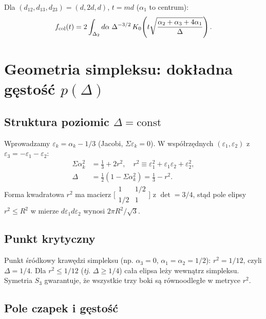 \documentclass[11pt,a4paper]{article}
\newcommand{\Dt}{\Delta}
\begin{document}
Dla $(d_{12},d_{13},d_{23})=(d,2d,d)$, $t=md$ ($\alpha_1$ to centrum):
\begin{equation}
\label{eq:f_col}
f_{\rm col}(t)
= 2\int_{\Delta_2} d\alpha\;\Dt^{-3/2}\,
K_0\!\left(t\sqrt{\frac{\alpha_2+\alpha_3+4\alpha_1}{\Dt}}\right).
\end{equation}

\section{Geometria simpleksu: dok\l{}adna g\k{e}sto\'s\'c $p(\Delta)$}
\label{sec:density}

\subsection{Struktura poziomic $\Delta=\text{const}$}

Wprowadzamy $\varepsilon_k=\alpha_k-1/3$ (Jacobi, $\Sigma\varepsilon_k=0$).
W wsp\'o\l{}rz\k{e}dnych $(\varepsilon_1,\varepsilon_2)$ z $\varepsilon_3=-\varepsilon_1-\varepsilon_2$:
\begin{align}
\Sigma\alpha_k^2 &= \tfrac13 + 2r^2,\quad
r^2 \equiv \varepsilon_1^2+\varepsilon_1\varepsilon_2+\varepsilon_2^2, \\
\Dt &= \tfrac12(1-\Sigma\alpha_k^2) = \tfrac13 - r^2. \label{eq:Delta_identity}
\end{align}
Forma kwadratowa $r^2$ ma macierz
$\bigl[\begin{smallmatrix}1&1/2\\1/2&1\end{smallmatrix}\bigr]$ z $\det=3/4$,
st\k{a}d pole elipsy $r^2\le R^2$ w mierze $d\varepsilon_1 d\varepsilon_2$ wynosi $2\pi R^2/\sqrt3$.

\subsection{Punkt krytyczny}

Punkt \'sr\'odkowy kraw\k{e}dzi simpleksu (np. $\alpha_3=0$, $\alpha_1=\alpha_2=1/2$):
$r^2=1/12$, czyli $\Dt=1/4$. Dla $r^2\le1/12$ (\emph{tj.} $\Dt\ge1/4$)
ca\l{}a elipsa le\.{z}y wewn\k{a}trz simpleksu.
Symetria $S_3$ gwarantuje, \.{z}e wszystkie trzy boki s\k{a} r\'ownoodleg\l{}e w metryce $r^2$.

\subsection{Pole czapek i g\k{e}sto\'s\'c}
\end{document}
